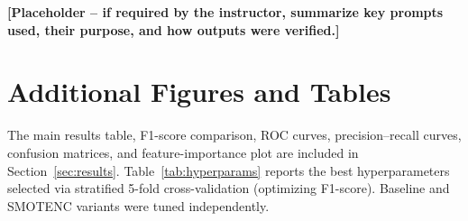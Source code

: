 \documentclass[conference]{IEEEtran}
\begin{document}
	\textbf{[Placeholder -- if required by the instructor, summarize key prompts used, their purpose, and how outputs were verified.]}
	
	\section{Additional Figures and Tables}
	\label{app:additional}
	
	The main results table, F1-score comparison, ROC curves, precision--recall curves, confusion matrices, and feature-importance plot are included in Section~\ref{sec:results}. Table~\ref{tab:hyperparams} reports the best hyperparameters selected via stratified 5-fold cross-validation (optimizing F1-score). Baseline and SMOTENC variants were tuned independently.
	
	\begin{table}[htbp]
		\caption{Selected Hyperparameters (5-fold CV, optimizing F1)}
		\label{tab:hyperparams}
		\begin{center}
			\footnotesize
		\end{center}
	\end{table}
	
\end{document}
